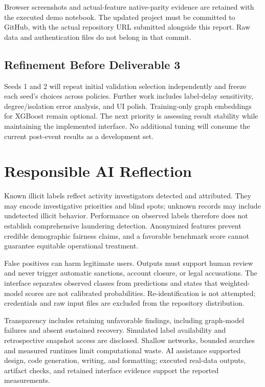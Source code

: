 \documentclass[10pt,twocolumn,letterpaper]{article}
\begin{document}
Browser screenshots and actual-feature native-parity evidence are retained with the executed demo notebook. The updated project must be committed to GitHub, with the actual repository URL submitted alongside this report. Raw data and authentication files do not belong in that commit.

\subsection{Refinement Before Deliverable 3}
Seeds 1 and 2 will repeat initial validation selection independently and freeze each seed's choices across policies. Further work includes label-delay sensitivity, degree/isolation error analysis, and UI polish. Training-only graph embeddings for XGBoost remain optional. The next priority is assessing result stability while maintaining the implemented interface. No additional tuning will consume the current post-event results as a development set.

\section{Responsible AI Reflection}
Known illicit labels reflect activity investigators detected and attributed. They may encode investigative priorities and blind spots; unknown records may include undetected illicit behavior. Performance on observed labels therefore does not establish comprehensive laundering detection. Anonymized features prevent credible demographic fairness claims, and a favorable benchmark score cannot guarantee equitable operational treatment.

False positives can harm legitimate users. Outputs must support human review and never trigger automatic sanctions, account closure, or legal accusations. The interface separates observed classes from predictions and states that weighted-model scores are not calibrated probabilities. Re-identification is not attempted; credentials and raw input files are excluded from the repository distribution.

Transparency includes retaining unfavorable findings, including graph-model failures and absent sustained recovery. Simulated label availability and retrospective snapshot access are disclosed. Shallow networks, bounded searches and measured runtimes limit computational waste. AI assistance supported design, code generation, writing, and formatting; executed real-data outputs, artifact checks, and retained interface evidence support the reported measurements.
\end{document}
